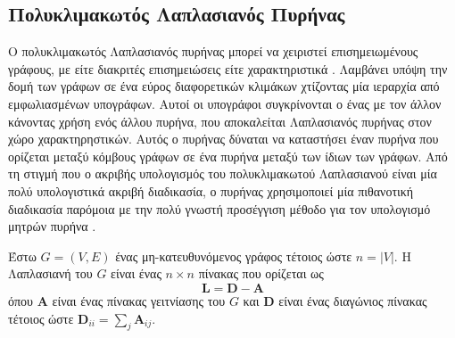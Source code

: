 \subsection{Πολυκλιμακωτός Λαπλασιανός Πυρήνας}
Ο πολυκλιμακωτός Λαπλασιανός πυρήνας μπορεί να χειριστεί επισημειωμένους γράφους, με είτε διακριτές επισημειώσεις είτε χαρακτηριστικά \cite{kondor2016multiscale}.
Λαμβάνει υπόψη την δομή των γράφων σε ένα εύρος διαφορετικών κλιμάκων χτίζοντας μία ιεραρχία από εμφωλιασμένων υπογράφων.
Αυτοί οι υπογράφοι συγκρίνονται ο ένας με τον άλλον κάνοντας χρήση ενός άλλου πυρήνα, που αποκαλείται Λαπλασιανός πυρήνας στον χώρο χαρακτηρηστικών.
Αυτός ο πυρήνας δύναται να καταστήσει έναν πυρήνα που ορίζεται μεταξύ κόμβους γράφων σε ένα πυρήνα μεταξύ των ίδιων των γράφων.
Από τη στιγμή που ο ακριβής υπολογισμός του πολυκλιμακωτού Λαπλασιανού είναι μία πολύ υπολογιστικά ακριβή διαδικασία, ο πυρήνας χρησιμοποιεί μία πιθανοτική διαδικασία παρόμοια με την πολύ γνωστή προσέγγιση μέθοδο  για τον υπολογισμό μητρών πυρήνα \cite{williams2001using}.

Έστω $G=(V,E)$ ένας μη-κατευθυνόμενος γράφος τέτοιος ώστε $n = |V|$.
Η Λαπλασιανή του $G$ είναι ένας $n \times n$ πίνακας που ορίζεται ως
\begin{equation*}
    \mathbf{L} = \mathbf{D} - \mathbf{A} 
\end{equation*}
όπου $\mathbf{A}$ είναι ένας πίνακας γειτνίασης του $G$ και $\mathbf{D}$ είναι ένας διαγώνιος πίνακας τέτοιος ώστε $\mathbf{D}_{ii} = \sum_j \mathbf{A}_{ij}$.

